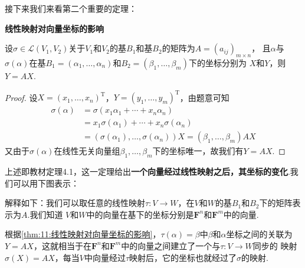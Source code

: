 接下来我们来看第二个重要的定理：
\begin{theorem}\label{thm:11:线性映射对向量坐标的影响}
    \textbf{\heiti 线性映射对向量坐标的影响}

    设$\sigma \in \mathcal{L}(V_1,V_2)$关于$V_1$和$V_2$的基$B_1$和基$B_2$的矩阵为$A=(a_{ij})_{m \times n}$，
    且$\alpha$与$\sigma(\alpha)$在基$B_1=(\alpha_1,\ldots,\alpha_n)$和$B_2=(\beta_1,\ldots,\beta_m)$下的坐标分别为
    $X$和$Y$，则$Y=AX$.
\end{theorem}
\begin{proof}
    设$X=(x_1,\ldots,x_n)^\mathrm{T}$，$Y=(y_1,\ldots,y_m)^\mathrm{T}$，由题意可知
    \begin{align*}
        \sigma(\alpha)&=\sigma(x_1\alpha_1+\cdots+x_n\alpha_n) \\
        &=x_1\sigma(\alpha_1)+\cdots+x_n\sigma(\alpha_n) \\
        &=(\sigma(\alpha_1),\ldots,\sigma(\alpha_n))X=(\beta_1,\ldots,\beta_m)AX
    \end{align*}
    又由于$\sigma(\alpha)$在线性无关向量组$\beta_1,\ldots,\beta_m$下的坐标唯一，故我们有$Y=AX$.
\end{proof}

上述即教材定理4.1，这一定理给出\textbf{一个向量经过线性映射之后，其坐标的变化}.我们可以用下图表示：
\begin{figure}[htbp]
    \centering
\end{figure}

解释如下：我们可以取任意的线性映射$\tau:V\to W$，在$V$和$W$的基$B_1$和$B_2$下的矩阵表示为$A$.我们知道
$V$和$W$中的向量在基下的坐标分别是$\mathbf{F}^n$和$\mathbf{F}^m$中的向量.

根据\autoref{thm:11:线性映射对向量坐标的影响}，$\tau(\alpha)=\beta$中$\beta$和$\alpha$坐标之间的关联为
$Y=AX$，这就相当于在$\mathbf{F}^n$和$\mathbf{F}^m$中的向量之间建立了一个与$\tau:V\to W$同步的
映射$\sigma(X)=AX$，每当$V$中向量经过$\tau$映射后，它的坐标也就经过了$\sigma$的映射.

